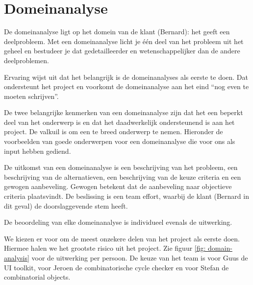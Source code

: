 
\section{Domeinanalyse}

De domeinanalyse ligt op het domein van de klant (Bernard): het geeft een
deelprobleem. Met een domeinanalyse licht je
\'e\'en deel van het probleem uit het geheel en bestudeer je dat gedetailleerder
en wetenschappelijker dan de andere deelproblemen.

Ervaring wijst uit dat het belangrijk is de domeinanalyses als eerste te doen.
Dat ondersteunt het project en voorkomt
de domeinanalyse aan het eind ``nog even te moeten schrijven''.

De twee belangrijke kenmerken van een domeinanalyse zijn dat het een beperkt
deel van het onderwerp is en dat het daadwerkelijk
ondersteunend is aan het project. De valkuil is om een te breed onderwerp te
nemen. Hieronder de voorbeelden van goede onderwerpen
voor een domeinanalyse die voor ons als input hebben gediend.

De uitkomst van een domeinanalyse is een beschrijving van het probleem,
een beschrijving van de alternatieven, een beschrijving van de keuze criteria en
een gewogen aanbeveling. Gewogen betekent dat de aanbeveling naar objectieve
criteria plaatsvindt.
De beslissing is een team effort, waarbij de klant (Bernard in dit geval)
de doorslaggevende stem heeft.

De beoordeling van elke domeinanalyse is individueel evenals de uitwerking.

We kiezen er voor om de meest onzekere delen van het project als eerste doen.
Hiermee halen we het grootste risico uit het
project. Zie figuur \ref{fig: domain-analysis} voor de uitwerking per persoon.
De keuze van het team is voor Guus de UI toolkit, voor Jeroen de combinatorische
cycle checker en voor Stefan de combinatorial objects.

